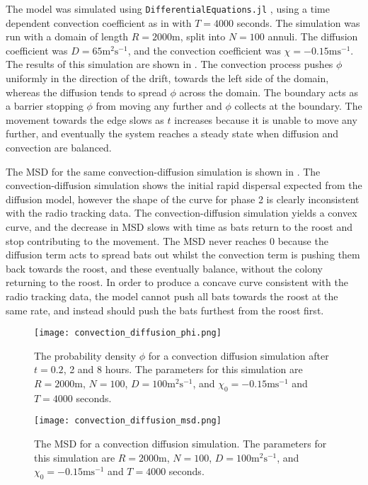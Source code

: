 The model was simulated using \texttt{DifferentialEquations.jl} \cite{DifferentialEquations}, using a time dependent convection coefficient as in  with $T = 4000$ seconds. The
simulation was run with a domain of length $R = 2000$m, split into $N = 100$
annuli. The diffusion coefficient was $D = 65\mathrm{m^2s^{-1}}$, and the convection coefficient
was $\chi =  - 0.15\mathrm{ms^{-1}}$. The results
of this simulation are shown in . The convection process pushes $\phi$ uniformly in the direction of the drift, towards the left side of the domain, whereas the diffusion tends to spread $\phi$ across the domain. The boundary acts as a barrier stopping $\phi$ from moving any further and $\phi$ collects at the boundary. The movement towards the edge slows as $t$ increases because it is unable to move any further, and eventually the system reaches a steady state when diffusion and convection are balanced.

The MSD for the same convection-diffusion simulation is shown in . The convection-diffusion simulation shows the initial rapid dispersal expected from the diffusion model, however the shape of the curve for phase 2 is clearly inconsistent with the radio tracking data. The convection-diffusion simulation yields a convex curve, and the decrease in MSD slows with time as bats return to the roost and stop contributing to the movement. The MSD never reaches 0 because the diffusion term acts to spread bats out whilst the convection term is pushing them back towards the roost, and these eventually balance, without the colony returning to the roost. In order to produce a concave curve consistent with the radio tracking data, the model cannot push all bats towards the roost at the same rate, and instead should push the bats furthest from the roost first.

  \begin{figure} [t]
      \centering
          \texttt{[image: convection\_diffusion\_phi.png]}
          \caption{The probability density $\phi$ for a convection diffusion simulation after $t = 0.2$, 2 and 8 hours. The parameters for this simulation are $R = 2000$m, $N = 100$,
          $D = 100\mathrm{m^2s^{-1}}$, and $\chi_0 = - 0.15\mathrm{ms^{-1}}$ and $T = 4000$ seconds.}
      \label{fig:convection_diffusion}
  \end{figure}
    \begin{figure} [t]
        \centering
            \texttt{[image: convection\_diffusion\_msd.png]}
            \caption{The MSD for a convection diffusion simulation. The parameters for this simulation are $R = 2000$m, $N = 100$,
            $D = 100\mathrm{m^2s^{-1}}$, and $\chi_0 = - 0.15\mathrm{ms^{-1}}$ and $T = 4000$ seconds.}
        \label{fig:convection_diffusion_MSD}
    \end{figure}

